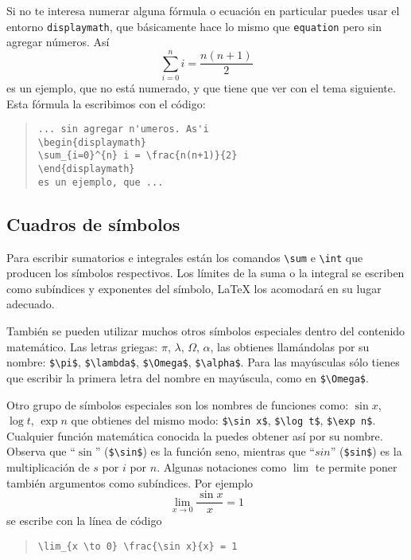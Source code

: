 Si no te interesa numerar alguna f\'ormula o ecuaci\'on en particular puedes usar
el entorno \texttt{displaymath}, que b\'asicamente hace lo mismo que \texttt{equation}
pero sin agregar n\'umeros. As\'i
\begin{displaymath}
\sum_{i=0}^{n} i = \frac{n(n+1)}{2}
\end{displaymath}
es un ejemplo, que no est\'a numerado, y que tiene que ver con el tema siguiente. Esta
f\'ormula la escribimos con el c\'odigo:
\begin{quote}
\begin{verbatim}
... sin agregar n'umeros. As'i
\begin{displaymath}
\sum_{i=0}^{n} i = \frac{n(n+1)}{2}
\end{displaymath}
es un ejemplo, que ...
\end{verbatim}
\end{quote}


\subsection{Cuadros de s\'imbolos}

Para  escribir sumatorios e integrales
est\'an los comandos \verb|\sum| e \verb|\int| que producen los s\'imbolos
respectivos. Los l\'imites de la suma o la integral se escriben como
sub\'indices y exponentes del s\'imbolo, \LaTeX{} los acomodar\'a en su lugar
adecuado.

Tambi\'en se pueden utilizar muchos otros s\'imbolos especiales dentro del contenido matem\'atico. 
Las letras griegas: $\pi$, $\lambda$, $\Omega$, $\alpha$, las obtienes llam\'andolas
por su nombre: \verb|$\pi$|, \verb|$\lambda$|, \verb|$\Omega$|, \verb|$\alpha$|.
Para las may\'usculas s\'olo tienes que escribir la primera letra del nombre en may\'uscula,
como en \verb|$\Omega$|.

Otro grupo de s\'imbolos especiales son los nombres de funciones como: $\sin x$, $\log t$,
$\exp n$ que obtienes del mismo modo: \verb|$\sin x$|, \verb|$\log t$|, \verb|$\exp n$|.
Cualquier funci\'on matem\'atica conocida la puedes obtener as\'i por su nombre.
Observa que ``$\sin$'' (\verb|$\sin$|) es la funci\'on seno, mientras que ``$sin$''
(\verb|$sin$|) es la multiplicaci\'on de $s$ por $i$ por $n$. Algunas notaciones
como $\lim$ te permite poner tambi\'en argumentos como sub\'indices. Por ejemplo
\begin{equation}
\lim_{x \to 0} \frac{\sin x}{x} = 1
\end{equation}
se escribe con la l\'inea de c\'odigo
\begin{quote}
\begin{verbatim}
\lim_{x \to 0} \frac{\sin x}{x} = 1
\end{verbatim}
\end{quote}

